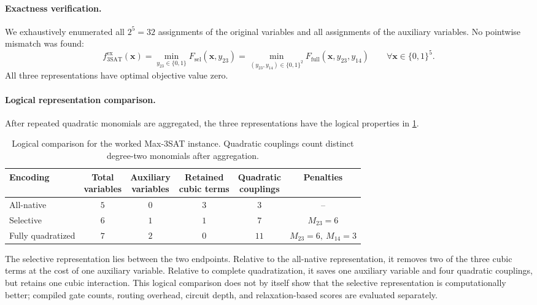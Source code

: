 \documentclass[a4paper,onecolumn,11pt,unpublished]{quantumarticle}
\newcommand{\bits}{\{0,1\}}
\theoremstyle{remark}
\begin{document}
\paragraph{Exactness verification.}
We exhaustively enumerated all $2^5=32$ assignments of the original variables
and all assignments of the auxiliary variables. No pointwise mismatch was
found:
\begin{equation}
    f_{\mathrm{3SAT}}^{\mathrm{ex}}(\bm x)
    =\min_{y_{23}\in\bits}F_{\mathrm{sel}}(\bm x,y_{23})
    =\min_{(y_{23},y_{14})\in\bits^2}
       F_{\mathrm{full}}(\bm x,y_{23},y_{14})
    \qquad\forall\bm x\in\bits^5.
    \label{eq:max3sat-worked-verification}
\end{equation}
All three representations have optimal objective value zero.

\paragraph{Logical representation comparison.}
After repeated quadratic monomials are aggregated, the three representations
have the logical properties in \cref{tab:max3sat-worked-comparison}.
\begin{table}[t]
    \centering
    \small
    \caption{Logical comparison for the worked Max-3SAT instance. Quadratic
    couplings count distinct degree-two monomials after aggregation.}
    \label{tab:max3sat-worked-comparison}
    \begin{tabular}{@{}lccccc@{}}
        \toprule
        Encoding
        & \shortstack{Total\\variables}
        & \shortstack{Auxiliary\\variables}
        & \shortstack{Retained\\cubic terms}
        & \shortstack{Quadratic\\couplings}
        & Penalties\\
        \midrule
        All-native & $5$ & $0$ & $3$ & $3$  & --\\
        Selective  & $6$ & $1$ & $1$ & $7$  & $M_{23}=6$\\
        Fully quadratized & $7$ & $2$ & $0$ & $11$
            & $M_{23}=6,\ M_{14}=3$\\
        \bottomrule
    \end{tabular}
\end{table}
The selective representation lies between the two endpoints. Relative to the
all-native representation, it removes two of the three cubic terms at the cost
of one auxiliary variable. Relative to complete quadratization, it saves one
auxiliary variable and four quadratic couplings, but retains one cubic
interaction. This logical comparison does not by itself show that the
selective representation is computationally better; compiled gate counts,
routing overhead, circuit depth, and relaxation-based scores are evaluated
separately.
\end{document}
